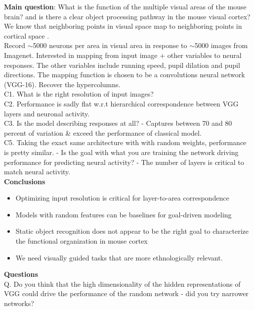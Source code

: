 \documentclass[12pt]{article}
\begin{document}
\textbf{Main question}: What is the function of the multiple visual areas of the mouse brain? and is there a clear object processing pathway in the mouse visual cortex? \\

We know that neighboring points in visual space map to neighboring points in cortical space \cite{Wang2007}. \\

Record $\sim$5000 neurons per area in visual area in response to $\sim$5000 images from Imagenet. Interested in mapping from input image + other variables to neural responses. The other variables include running speed, pupil dilation and pupil directions. The mapping function is chosen to be a convolutions neural network (VGG-16). Recover the hypercolumns. \\

C1. What is the right resolution of input images? \\

C2. Performance is sadly flat w.r.t hierarchical correspondence between VGG layers and neuronal activity. \\

C3. Is the model describing responses at all? - Captures between 70 and 80 percent of variation \& exceed the performance of classical model. \\

C5. Taking the exact same architecture with with random weights, performance is pretty similar. - Is the goal with what you are training the network driving performance for predicting neural activity? - The number of layers is critical to match neural activity. \\

\textbf{Conclusions}
\begin{itemize}
    \item Optimizing input resolution is critical for layer-to-area correspondence
    \item Models with random features can be baselines for goal-driven modeling
    \item Static object recognition does not appear to be the right goal to characterize the functional organization in mouse cortex
    \item We need visually guided tasks that are more ethnologically relevant. 
\end{itemize}

\textbf{Questions} \\

Q. Do you think that the high dimensionality of the hidden representations of VGG could drive the performance of the random network - did you try narrower networks? \\
\end{document}
